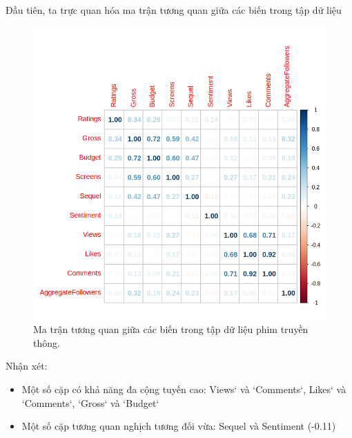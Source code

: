 Đầu tiên, ta trực quan hóa ma trận tương quan giữa các biến trong tập dữ liệu
\begin{figure}[H]
    \centering
    \includegraphics[width=0.75\columnwidth]{csm_figures/corr.png}
    \caption{Ma trận tương quan giữa các biến trong tập dữ liệu phim truyền thông.}
    \label{fig:csm_corr}
\end{figure}

Nhận xét:
\begin{itemize}
    \item Một số cặp có khả năng đa cộng tuyến cao: Views` và `Comments`, Likes` và `Comments`, `Gross` và `Budget`
    \item Một số cặp tương quan nghịch tương đối vừa: Sequel và Sentiment (-0.11)
\end{itemize}

